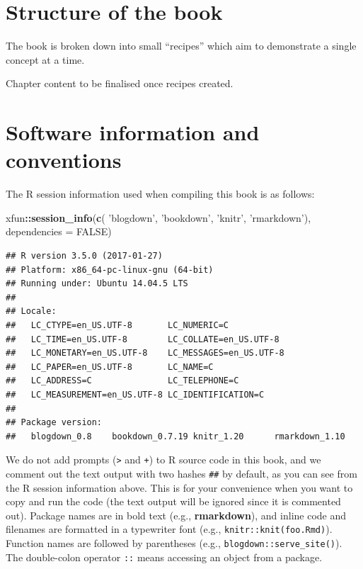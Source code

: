 \documentclass[]{book}
\newenvironment{Shaded}{\begin{snugshade}}{\end{snugshade}}
\newcommand{\KeywordTok}[1]{\textcolor[rgb]{0.13,0.29,0.53}{\textbf{#1}}}
\newcommand{\DataTypeTok}[1]{\textcolor[rgb]{0.13,0.29,0.53}{#1}}
\newcommand{\StringTok}[1]{\textcolor[rgb]{0.31,0.60,0.02}{#1}}
\newcommand{\OtherTok}[1]{\textcolor[rgb]{0.56,0.35,0.01}{#1}}
\newcommand{\OperatorTok}[1]{\textcolor[rgb]{0.81,0.36,0.00}{\textbf{#1}}}
\newcommand{\NormalTok}[1]{#1}
\begin{document}
\section*{Structure of the book}\label{structure-of-the-book}

The book is broken down into small ``recipes'' which aim to demonstrate
a single concept at a time.

Chapter content to be finalised once recipes created.

\section*{Software information and conventions}\label{software-info}

The R session information used when compiling this book is as follows:

\begin{Shaded}
\begin{Highlighting}[]
\NormalTok{xfun}\OperatorTok{::}\KeywordTok{session_info}\NormalTok{(}\KeywordTok{c}\NormalTok{(}
  \StringTok{'blogdown'}\NormalTok{, }\StringTok{'bookdown'}\NormalTok{, }\StringTok{'knitr'}\NormalTok{, }\StringTok{'rmarkdown'}\NormalTok{), }\DataTypeTok{dependencies =} \OtherTok{FALSE}\NormalTok{)}
\end{Highlighting}
\end{Shaded}

\begin{verbatim}
## R version 3.5.0 (2017-01-27)
## Platform: x86_64-pc-linux-gnu (64-bit)
## Running under: Ubuntu 14.04.5 LTS
## 
## Locale:
##   LC_CTYPE=en_US.UTF-8       LC_NUMERIC=C              
##   LC_TIME=en_US.UTF-8        LC_COLLATE=en_US.UTF-8    
##   LC_MONETARY=en_US.UTF-8    LC_MESSAGES=en_US.UTF-8   
##   LC_PAPER=en_US.UTF-8       LC_NAME=C                 
##   LC_ADDRESS=C               LC_TELEPHONE=C            
##   LC_MEASUREMENT=en_US.UTF-8 LC_IDENTIFICATION=C       
## 
## Package version:
##   blogdown_0.8    bookdown_0.7.19 knitr_1.20      rmarkdown_1.10
\end{verbatim}

We do not add prompts (\texttt{\textgreater{}} and \texttt{+}) to R
source code in this book, and we comment out the text output with two
hashes \texttt{\#\#} by default, as you can see from the R session
information above. This is for your convenience when you want to copy
and run the code (the text output will be ignored since it is commented
out). Package names are in bold text (e.g., \textbf{rmarkdown}), and
inline code and filenames are formatted in a typewriter font (e.g.,
\texttt{knitr::knit(\textquotesingle{}foo.Rmd\textquotesingle{})}).
Function names are followed by parentheses (e.g.,
\texttt{blogdown::serve\_site()}). The double-colon operator \texttt{::}
means accessing an object from a package.
\end{document}
